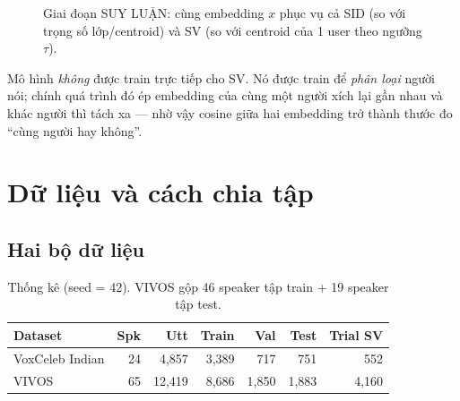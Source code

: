 \documentclass[12pt,a4paper]{article}
\begin{document}
\begin{figure}[H]
\centering
{}
\caption{Giai đoạn SUY LUẬN: cùng embedding $x$ phục vụ cả SID (so với trọng số
lớp/centroid) và SV (so với centroid của 1 user theo ngưỡng $\tau$).}
\end{figure}

\begin{diembox}
Mô hình \emph{không} được train trực tiếp cho SV. Nó được train để \emph{phân loại}
người nói; chính quá trình đó ép embedding của cùng một người xích lại gần nhau và
khác người thì tách xa --- nhờ vậy cosine giữa hai embedding trở thành thước đo
``cùng người hay không''.
\end{diembox}

\section{Dữ liệu và cách chia tập}
\subsection{Hai bộ dữ liệu}
\begin{table}[H]
\centering\small
\begin{tabular}{lrrrrrr}
\toprule
\textbf{Dataset} & \textbf{Spk} & \textbf{Utt} & \textbf{Train} & \textbf{Val} & \textbf{Test} & \textbf{Trial SV} \\
\midrule
VoxCeleb Indian & 24 & 4{,}857 & 3{,}389 & 717 & 751 & 552 \\
VIVOS & 65 & 12{,}419 & 8{,}686 & 1{,}850 & 1{,}883 & 4{,}160 \\
\bottomrule
\end{tabular}
\caption{Thống kê (seed = 42). VIVOS gộp 46 speaker tập train + 19 speaker tập test.}
\end{table}
\end{document}
